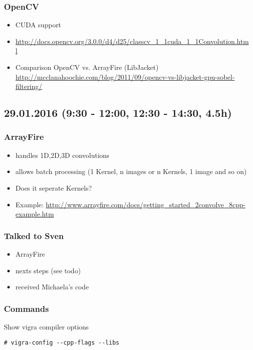 \documentclass[12pt,a4paper]{article}
\begin{document}
  \subsubsection{OpenCV}
    \begin{itemize}
      \item CUDA support
      \item \url{http://docs.opencv.org/3.0.0/d4/d25/classcv_1_1cuda_1_1Convolution.html}
      \item Comparison OpenCV vs. ArrayFire (LibJacket) \url{http://mcclanahoochie.com/blog/2011/09/opencv-vs-libjacket-gpu-sobel-filtering/}
    \end{itemize}


\subsection{29.01.2016 (9:30 - 12:00, 12:30 - 14:30, 4.5h)}

  \subsubsection{ArrayFire}
    \begin{itemize}
      \item handles 1D,2D,3D convolutions
      \item allows batch processing (1 Kernel, n images or n Kernels, 1 image and so on)
      \item Does it seperate Kernels?
      \item Example: \url{http://www.arrayfire.com/docs/getting_started_2convolve_8cpp-example.htm}
    \end{itemize}

  \subsubsection{Talked to Sven}
    \begin{itemize}
      \item ArrayFire
      \item nexts steps (see todo)
      \item received Michaela's code
    \end{itemize}

  \subsubsection{Commands}

    Show vigra compiler options
    \begin{lstlisting}[style=BashInputStyle]
    # vigra-config --cpp-flags --libs 
    \end{lstlisting}
\end{document}
